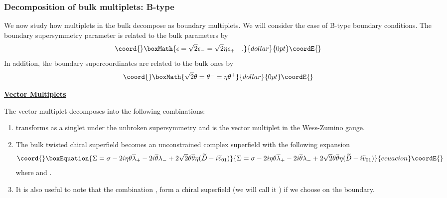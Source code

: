 \documentclass[a4paper,12pt]{article}
\begin{document}
\subsubsection{Decomposition of bulk multiplets: B-type}

We now study how  \coordHE{} multiplets in the bulk
decompose as boundary multiplets. We will consider the case of B-type
boundary conditions. The boundary supersymmetry parameter \myHighlight{$\epsilon$}\coordHE{}
is related to the bulk parameters by $$\coord{}\boxMath{\epsilon=\sqrt2 \epsilon_-
=\sqrt2 \eta \epsilon_+\quad .}{dollar}{0pt}\coordE{}$$ In addition, the 
boundary supercoordinates are related to the bulk ones by
$$\coord{}\boxMath{
\sqrt2\theta=\theta^-=\eta\theta^+ 
}{dollar}{0pt}\coordE{}$$
\begin{flushleft}
\underline{\bf {}\coordHE{} Vector Multiplets}
\end{flushleft}

The vector multiplet decomposes into the following combinations:
\begin{enumerate}
\item  {}\coordHE{}
transforms as a singlet under the unbroken supersymmetry 
and is the \coordHE{} vector multiplet in the Wess-Zumino gauge.
\item The bulk twisted chiral superfield \myHighlight{$\Sigma$}\coordHE{} becomes an
unconstrained  complex \coordHE{} superfield with the following
expansion
\begin{equation}\coord{}\boxEquation{
\Sigma = \sigma -2i\eta\theta \overline{\lambda}_+ -2i\overline{\theta}
\lambda_- + 2 \sqrt2\theta \overline{\theta}\eta (\widetilde{D}
-i\widetilde{v}_{01}) 
}{
\Sigma = \sigma -2i\eta\theta \overline{\lambda}_+ -2i\overline{\theta}
\lambda_- + 2 \sqrt2\theta \overline{\theta}\eta (\widetilde{D}
-i\widetilde{v}_{01}) 
}{ecuacion}\coordE{}\end{equation}
where \coordHE{} and
\coordHE{}.
\item It is also useful to note that the combination
\coordHE{}, \myHighlight{$(\lambda_+ -\eta
\lambda_-)$}\coordHE{} form a chiral superfield (we will call it \coordHE{}) if we choose
\coordHE{} on the boundary. 
\end{enumerate}
\end{document}
